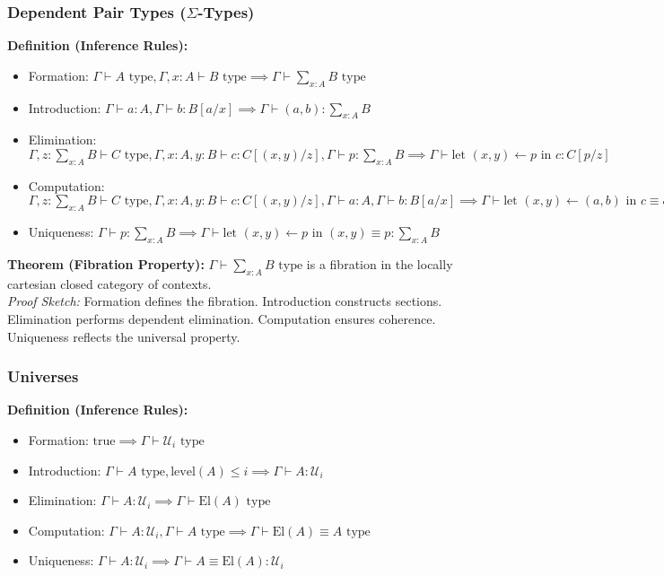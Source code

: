 \documentclass{article}
\begin{document}
\subsubsection{Dependent Pair Types ($\Sigma$-Types)}
\textbf{Definition (Inference Rules):}
\begin{itemize}
    \item Formation: $\Gamma \vdash A \text{ type}, \Gamma, x : A \vdash B \text{ type} \implies \Gamma \vdash \sum_{x : A} B \text{ type}$
    \item Introduction: $\Gamma \vdash a : A, \Gamma \vdash b : B[a / x] \implies \Gamma \vdash (a, b) : \sum_{x : A} B$
    \item Elimination: $\Gamma, z : \sum_{x : A} B \vdash C \text{ type}, \Gamma, x : A, y : B \vdash c : C[(x, y) / z], \Gamma \vdash p : \sum_{x : A} B \implies \Gamma \vdash \text{let } (x, y) \leftarrow p \text{ in } c : C[p / z]$
    \item Computation: $\Gamma, z : \sum_{x : A} B \vdash C \text{ type}, \Gamma, x : A, y : B \vdash c : C[(x, y) / z], \Gamma \vdash a : A, \Gamma \vdash b : B[a / x] \implies \Gamma \vdash \text{let } (x, y) \leftarrow (a, b) \text{ in } c \equiv c[a / x, b / y] : C[(a, b) / z]$
    \item Uniqueness: $\Gamma \vdash p : \sum_{x : A} B \implies \Gamma \vdash \text{let } (x, y) \leftarrow p \text{ in } (x, y) \equiv p : \sum_{x : A} B$
\end{itemize}

\textbf{Theorem (Fibration Property):}
$\Gamma \vdash \sum_{x : A} B \text{ type}$ is a fibration in the locally cartesian closed category of contexts. \\
\textit{Proof Sketch:} Formation defines the fibration. Introduction constructs sections. Elimination performs dependent elimination. Computation ensures coherence. Uniqueness reflects the universal property.

\subsubsection{Universes}
\textbf{Definition (Inference Rules):}
\begin{itemize}
    \item Formation: $\text{true} \implies \Gamma \vdash \mathcal{U}_i \text{ type}$
    \item Introduction: $\Gamma \vdash A \text{ type}, \text{level}(A) \leq i \implies \Gamma \vdash A : \mathcal{U}_i$
    \item Elimination: $\Gamma \vdash A : \mathcal{U}_i \implies \Gamma \vdash \text{El}(A) \text{ type}$
    \item Computation: $\Gamma \vdash A : \mathcal{U}_i, \Gamma \vdash A \text{ type} \implies \Gamma \vdash \text{El}(A) \equiv A \text{ type}$
    \item Uniqueness: $\Gamma \vdash A : \mathcal{U}_i \implies \Gamma \vdash A \equiv \text{El}(A) : \mathcal{U}_i$
\end{itemize}
\end{document}
